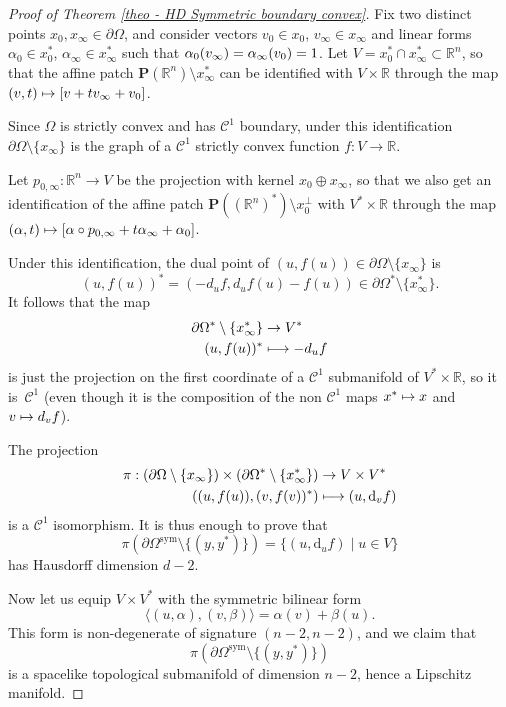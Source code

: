 \documentclass[11pt]{article}
\numberwithin{equation}{section}
\newcommand{\sym}{\mathrm{sym}}
\newcommand\mto{\mathchoice{\longmapsto}{\mapsto}{\mapsto}{\mapsto}}
\theoremstyle{definition}
\newcommand{\proj}{\mathbf{P}}
\newcommand{\R}{\mathbb{R}}
\begin{document}
\begin{proof}[Proof of Theorem \ref{theo - HD Symmetric boundary convex}]
Fix two distinct points $x_0,x_\infty\in \partial \Omega$, and consider vectors $v_0\!\in\!x_0$, $v_\infty\!\in\!x_\infty$ and linear forms $\alpha_0\!\in\!x_0^*$, $\alpha_\infty\!\in\!x_\infty^*$ such that $\alpha_0(v_\infty)=\alpha_\infty(v_0)=\nobreak1$. Let $V=x_0^*\cap x_\infty^*\subset \R^n$, so that the affine patch $\proj(\R^n)\setminus x_\infty^*$ can be identified with $V\times \R$ through the map $(v,t)\mto [v+tv_\infty+v_0]$.

Since $\Omega$ is strictly convex and has $\mathcal C^1$ boundary, under this identification $\partial\Omega\setminus \{x_\infty\}$ is the graph of a $\mathcal C^1$ strictly convex function $f:V\to \R$.

Let $p_{0,\infty}:\R^n\to V$ be the projection with kernel $x_0\oplus x_\infty$, so that we also get an identification of the affine patch $\proj\left((\R^n)^*\right)\setminus x_0^\perp$ with $V^*\times \R$ through the map $(\alpha,t)\mto [\alpha\circ p_{0,\infty} + t \alpha_\infty + \alpha_0]$.

Under this identification, the dual point of $(u,f(u))\in \partial \Omega\setminus \{x_\infty\}$ is
\[
(u,f(u))^*=(-d_uf,d_uf(u)-f(u))\in \partial\Omega^*\setminus \{x_\infty^*\}.
\]
It follows that the map
\begin{align*}
\partial\Omega^*\setminus \{x_\infty^*\} & \to V^* \\
(u,f(u))^* & \mto -d_uf
\end{align*}
is just the projection on the first coordinate of a $\mathcal C^1$ submanifold of $V^*\times \R$, so it is~$\mathcal C^1$ (even though it is the composition of the non $\mathcal C^1$ maps $x^*\mto x$ and $v\mto d_vf$).

The projection
\begin{align*}
\pi: \left(\partial \Omega \setminus \{x_\infty\}\right)\times \left(\partial \Omega^*\setminus \{x_\infty^*\}\right) & \to V\times V^*\\
\left((u, f(u)), (v,f(v))^*\right) & \mto (u, \mathrm d_v f)
\end{align*}
is a $\mathcal C^1$ isomorphism. It is thus enough to prove that
\[\pi(\partial \Omega^{\sym} \setminus \{(y,y^*)\}) = \{(u, \mathrm d_u f)\mid u\in V\}\]
has Hausdorff dimension $d-2$.

Now let us equip $V \times V^*$ with the symmetric bilinear form
\[\langle (u,\alpha), (v,\beta)\rangle = \alpha(v) + \beta(u).\]
This form is non-degenerate of signature $(n-2,n-2)$, and we claim that
\[
\pi(\partial \Omega^{\sym} \setminus \{(y,y^*)\})
\]
is a spacelike topological submanifold of dimension $n-2$, hence a Lipschitz manifold.


\end{proof}
\end{document}
